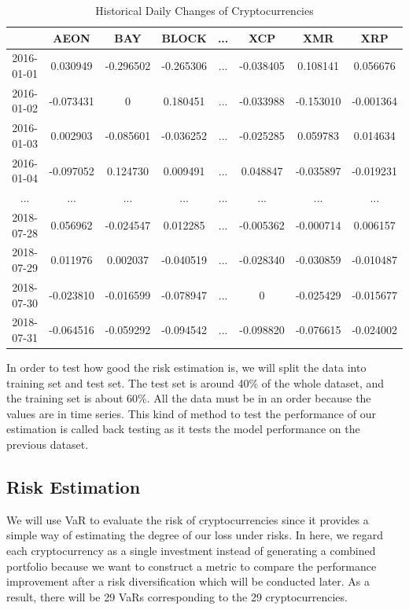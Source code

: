 \documentclass[11pt]{article} %
\theoremstyle{plain}
\theoremstyle{definition}
\begin{document}
{
  \begin{table}[ht]
    \centering
    \scriptsize
    \begin{tabular}{|c|c c c c c c c|}
      \hline
       & AEON & BAY & BLOCK & ... & XCP & XMR & XRP \\ [0.5ex]
      \hline
      2016-01-01 & 0.030949 & -0.296502 & -0.265306 & ... & -0.038405 & 0.108141 & 0.056676 \\
      \hline
      2016-01-02 & -0.073431 & 0 & 0.180451 & ... & -0.033988 & -0.153010 & 	-0.001364 \\
      \hline
      2016-01-03 & 0.002903 & -0.085601 & -0.036252 & ... & -0.025285 & 0.059783 & 0.014634 \\
      \hline
      2016-01-04 & -0.097052 & 0.124730 & 0.009491 & ... & 0.048847 & -0.035897 & -0.019231 \\
      \hline
      ... & ... & ... & ... & ... & ... & ... & ... \\
      \hline
      2018-07-28 & 0.056962 & -0.024547 & 0.012285 & ... & -0.005362 & -0.000714 & 0.006157 \\
      \hline
      2018-07-29 & 0.011976 & 0.002037 & -0.040519 & ... & -0.028340 & -0.030859 & -0.010487 \\
      \hline
      2018-07-30 & -0.023810 & -0.016599 & -0.078947 & ... & 0 & -0.025429 & -0.015677 \\
      \hline
      2018-07-31 & -0.064516 & -0.059292 & -0.094542 & ... & -0.098820 & -0.076615 & -0.024002 \\
      \hline
    \end{tabular}
    \caption{Historical Daily Changes of Cryptocurrencies}
    \label{table:dccrypto}
  \end{table}
}

In order to test how good the risk estimation is, we will split the data into training set and test set. The test set is around 40\% of the whole dataset, and the training set is about 60\%. All the data must be in an order because the values are in time series. This kind of method to test the performance of our estimation is called back testing as it tests the model performance on the previous dataset.

\subsection{Risk Estimation}

We will use VaR to evaluate the risk of cryptocurrencies since it provides a simple way of estimating the degree of our loss under risks. In here, we regard each cryptocurrency as a single investment instead of generating a combined portfolio because we want to construct a metric to compare the performance improvement after a risk diversification which will be conducted later. As a result, there will be 29 VaRs corresponding to the 29 cryptocurrencies.
\end{document}
